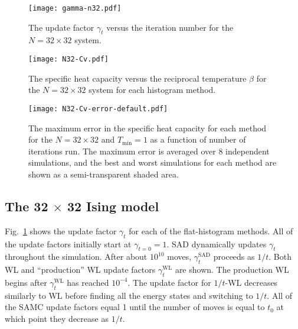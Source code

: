 \documentclass[letterpaper,twocolumn,amsmath,amssymb,pre,aps,10pt]{revtex4-1}
\begin{document}
\begin{figure}
\texttt{[image: gamma-n32.pdf]}
  \caption{
  The update factor $\gamma_t$ versus the iteration number for the $N=32 \times 32$
  system.}
  \label{fig:N32-gamma}
\end{figure}

\begin{figure}
  \texttt{[image: N32-Cv.pdf]}
    \caption{
    The specific heat capacity versus the reciprocal temperature $\beta$ for the $N=32 \times 32$ system for each histogram method.}
    \label{fig:N32-cv}
  \end{figure}

\begin{figure}
  \texttt{[image: N32-Cv-error-default.pdf]}
  \caption{The maximum error in the specific heat capacity for each method for the $N=32 \times 32$ and $T_{\min} = 1$ as a function of number of iterations run.  The maximum error is averaged over 8 independent simulations, and the best and worst simulations for each method are shown as a semi-transparent shaded area.}
  \label{fig:N32-cv-error}
\end{figure}


\subsection{The 32 $\times$ 32 Ising model}
Fig.~\ref{fig:N32-gamma} shows the update factor $\gamma_t$ for each of the flat-histogram methods. All of the update factors initially start at $\gamma_{t=0} = 1$. SAD dynamically updates $\gamma_t$ throughout the simulation. After about $10^{10}$ moves, $\gamma^{\text{SAD}}_t$ proceeds as $1/t$. Both WL and ``production'' WL update factors $\gamma^{\text{WL}}_t$ are shown. The production WL begins after $\gamma^{\text{WL}}_t$ has reached $10^{-4}$. The update factor for $1/t$-WL decreases similarly to WL before finding all the energy states and switching to $1/t$. All of the SAMC update factors equal 1 until the number of moves is equal to $t_0$ at which point they decrease as $1/t$.
\end{document}
